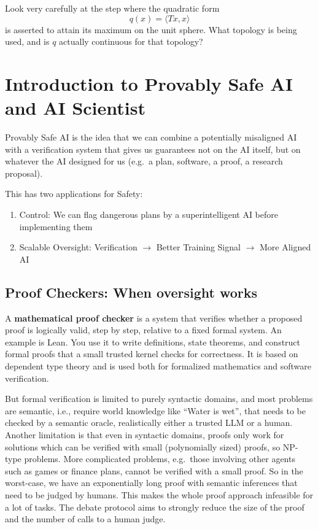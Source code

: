 \documentclass[11pt]{article}
\begin{document}
\begin{hint}
Look very carefully at the step where the quadratic form
\[
q(x)=\langle Tx,x\rangle
\]
is asserted to attain its maximum on the unit sphere.
What topology is being used, and is \(q\) actually continuous for that topology?
\end{hint}

\section{Introduction to Provably Safe AI and AI Scientist}
\label{sec:psai}

Provably Safe AI is the idea that we can combine a potentially misaligned AI
with a verification system that gives us guarantees not on the AI itself, but on
whatever the AI designed for us (e.g.\ a plan, software, a proof, a research
proposal).

This has two applications for Safety:

\begin{enumerate}
  \item Control: We can flag dangerous plans by a superintelligent AI before
    implementing them
  \item Scalable Oversight: Verification $\rightarrow$ Better Training Signal
    $\rightarrow$ More Aligned AI
\end{enumerate}

\subsection{Proof Checkers: When oversight works}

A \textbf{mathematical proof checker} is a system that verifies whether a
proposed proof is logically valid, step by step, relative to a fixed formal
system. An example is Lean. You use it to write definitions, state theorems, and
construct formal proofs that a small trusted kernel checks for correctness. It is
based on dependent type theory and is used both for formalized mathematics and
software verification.

But formal verification is limited to purely syntactic domains, and most problems
are semantic, i.e., require world knowledge like ``Water is wet'', that needs to
be checked by a semantic oracle, realistically either a trusted LLM or a human.
Another limitation is that even in syntactic domains, proofs only work for
solutions which can be verified with small (polynomially sized) proofs, so
NP-type problems. More complicated problems, e.g.\ those involving other agents
such as games or finance plans, cannot be verified with a small proof. So in the
worst-case, we have an exponentially long proof with semantic inferences that
need to be judged by humans. This makes the whole proof approach infeasible for a
lot of tasks. The debate protocol aims to strongly reduce the size of the proof
and the number of calls to a human judge.
\end{document}
